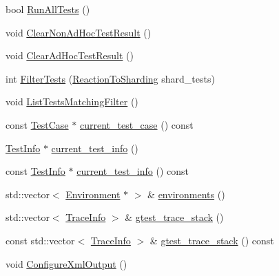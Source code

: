 \begin{DoxyCompactItemize}
\item 
bool \hyperlink{classtesting_1_1internal_1_1UnitTestImpl_a4d5d6a2e8fa3b918a284252602a98279}{\-Run\-All\-Tests} ()
\item 
void \hyperlink{classtesting_1_1internal_1_1UnitTestImpl_a3f7a43dd50595257ac958e7ec9112945}{\-Clear\-Non\-Ad\-Hoc\-Test\-Result} ()
\item 
void \hyperlink{classtesting_1_1internal_1_1UnitTestImpl_ab35604304840b940d31f5153986b7e19}{\-Clear\-Ad\-Hoc\-Test\-Result} ()
\item 
int \hyperlink{classtesting_1_1internal_1_1UnitTestImpl_af8cfcffb71cba69a55105ddac96786aa}{\-Filter\-Tests} (\hyperlink{classtesting_1_1internal_1_1UnitTestImpl_ac8d671a300e2bd293e21f8ad1612543c}{\-Reaction\-To\-Sharding} shard\-\_\-tests)
\item 
void \hyperlink{classtesting_1_1internal_1_1UnitTestImpl_abc77b71cd244096a75b13b8a2d9f7d14}{\-List\-Tests\-Matching\-Filter} ()
\item 
const \hyperlink{classtesting_1_1TestCase}{\-Test\-Case} $\ast$ \hyperlink{classtesting_1_1internal_1_1UnitTestImpl_af774518d9be68f728e9fffb00433ce69}{current\-\_\-test\-\_\-case} () const 
\item 
\hyperlink{classtesting_1_1TestInfo}{\-Test\-Info} $\ast$ \hyperlink{classtesting_1_1internal_1_1UnitTestImpl_aff1e50095f685628d566cb3ac72f902f}{current\-\_\-test\-\_\-info} ()
\item 
const \hyperlink{classtesting_1_1TestInfo}{\-Test\-Info} $\ast$ \hyperlink{classtesting_1_1internal_1_1UnitTestImpl_a7e73834280234683e770ad12dc7c5ecc}{current\-\_\-test\-\_\-info} () const 
\item 
std\-::vector$<$ \hyperlink{classtesting_1_1Environment}{\-Environment} $\ast$ $>$ \& \hyperlink{classtesting_1_1internal_1_1UnitTestImpl_ab8c736184a052dbb4cb9e217683bae7a}{environments} ()
\item 
std\-::vector$<$ \hyperlink{structtesting_1_1internal_1_1TraceInfo}{\-Trace\-Info} $>$ \& \hyperlink{classtesting_1_1internal_1_1UnitTestImpl_a07ea86c2b77af0393783430499b22321}{gtest\-\_\-trace\-\_\-stack} ()
\item 
const std\-::vector$<$ \hyperlink{structtesting_1_1internal_1_1TraceInfo}{\-Trace\-Info} $>$ \& \hyperlink{classtesting_1_1internal_1_1UnitTestImpl_a289d5745773f4d2e5b339960d3e9ce68}{gtest\-\_\-trace\-\_\-stack} () const 
\item 
void \hyperlink{classtesting_1_1internal_1_1UnitTestImpl_acc7d69fbca3370bbdd13ee2b63576030}{\-Configure\-Xml\-Output} ()

\end{DoxyCompactItemize}
